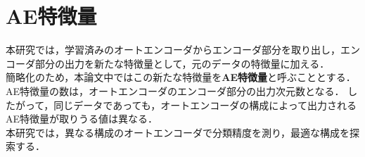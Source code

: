 \section{AE特徴量}
本研究では，学習済みのオートエンコーダからエンコーダ部分を取り出し，エンコーダ部分の出力を新たな特徴量として，元のデータの特徴量に加える．\\
簡略化のため，本論文中ではこの新たな特徴量を\textbf{AE特徴量}と呼ぶこととする．\\
AE特徴量の数は，オートエンコーダのエンコーダ部分の出力次元数となる．
したがって，同じデータであっても，オートエンコーダの構成によって出力されるAE特徴量が取りうる値は異なる．\\
本研究では，異なる構成のオートエンコーダで分類精度を測り，最適な構成を探索する．\\